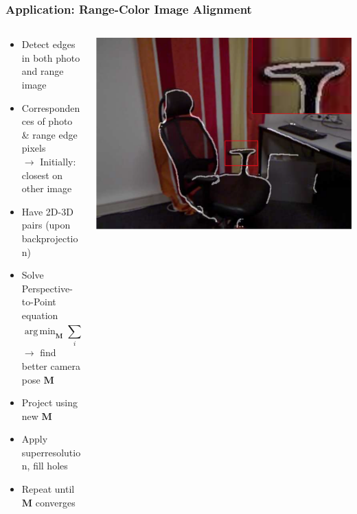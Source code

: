 \documentclass{beamer}
\DeclareMathOperator*{\argmin}{arg\,min}
\begin{document}
\begin{frame}
\frametitle{Application: Range-Color Image Alignment}
	\begin{columns}
	\begin{column}[T]{.7\textwidth}
		\begin{itemize}
		\item Detect edges in both photo and range image
		\item Correspondences of photo \& range edge pixels \\
			$\rightarrow$ Initially: closest on other image
		\item Have 2D-3D pairs (upon backprojection)
		\item Solve Perspective-to-Point equation \\
			\begin{equation*}
			\argmin_{\mathbf{M}} \sum_{i} (\mathbf{P} \mathbf{M} \vec{r_i} - \vec{c_i})^{2}
			\end{equation*}
			$\rightarrow$ find better camera pose $\mathbf{M}$
		\item Project using new $\mathbf{M}$
		\item Apply superresolution, fill holes
		\item Repeat until $\mathbf{M}$ converges
		\end{itemize}
	\end{column}
	\begin{column}[T]{.3\textwidth}
		\includegraphics[width=\textwidth]{riedges.png}
	\end{column}
	\end{columns}
\end{frame}
\end{document}
